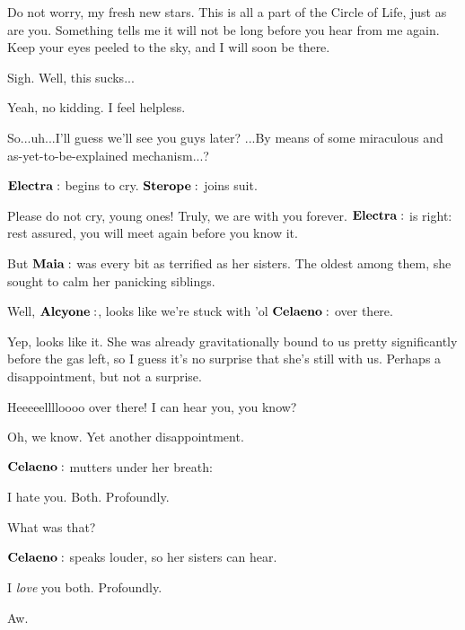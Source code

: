 \documentclass[main.tex]{subfiles}
\begin{document}
\Maia Do not worry, my fresh new stars. This is all a part of the Circle of Life, just as are you.  Something tells me it will not be long before you hear from me again. Keep your eyes peeled to the sky, and I will soon be there.  

\Electra Sigh.  Well, this sucks...

\Sterope  Yeah, no kidding.   I feel helpless.

\Electra So...uh...I'll guess we'll see you guys later?  ...By means of some miraculous and as-yet-to-be-explained mechanism...?

$\Electra$ begins to cry.  $\Sterope$ joins suit.

\Maia Please do not cry, young ones!  Truly, we are with you forever.  $\Electra$ is right: rest assured, you will meet again before you know it.

But $\Maia$ was every bit as terrified as her sisters.  The oldest among them, she sought to calm her panicking siblings.

\Taygete Well, $\Alcyone$, looks like we're stuck with 'ol $\Celaeno$ over there.

\Alcyone Yep, looks like it.  She was already gravitationally bound to us pretty significantly before the gas left, so I guess it's no surprise that she's still with us.  Perhaps a disappointment, but not a surprise.

\Celaeno Heeeeelllloooo over there!  I can hear you, you know? 

\Taygete Oh, we know.  Yet another disappointment.

$\Celaeno$ mutters under her breath:

\Celaeno I hate you.  Both.  Profoundly.

\Taygete What was that?

$\Celaeno$ speaks louder, so her sisters can hear.

\Celaeno I \textit{love} you both.  Profoundly.

\Alcyone Aw.
\end{document}
